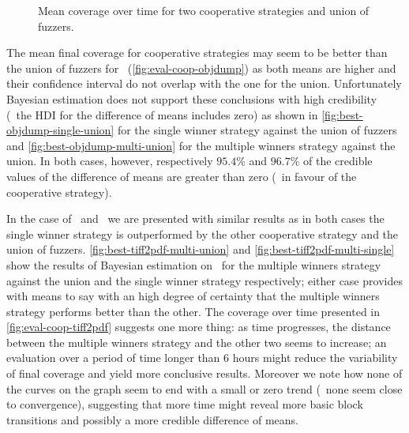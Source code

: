 \begin{figure}[h]
\begin{adjustbox}{center}
{            \label{fig:eval-coop-tiff2pdf}
        }
    \end{adjustbox}
    \caption{Mean coverage over time for two cooperative strategies and union of
    fuzzers.}
    \label{fig:eval-coop}
\end{figure}

The mean final coverage for cooperative strategies may seem to be better than
the union of fuzzers for \objdump\ (\autoref{fig:eval-coop-objdump}) as both
means are higher and their confidence interval do not overlap with the one for
the union. Unfortunately Bayesian estimation does not support these conclusions
with high credibility (\ie~the \ac{HDI} for the difference of means includes
zero) as shown in \autoref{fig:best-objdump-single-union} for the single winner
strategy against the union of fuzzers and \autoref{fig:best-objdump-multi-union}
for the multiple winners strategy against the union. In both cases, however,
respectively $95.4\%$ and $96.7\%$ of the credible values of the difference of
means are greater than zero (\ie~in favour of the cooperative strategy).

In the case of \tiffpdf\ and \listswf\ we are presented with similar results as
in both cases the single winner strategy is outperformed by the other
cooperative strategy and the union of fuzzers.
\autoref{fig:best-tiff2pdf-multi-union} and
\autoref{fig:best-tiff2pdf-multi-single} show the results of Bayesian estimation
on \tiffpdf\ for the multiple winners strategy against the union and the single
winner strategy respectively; either case provides with means to say with an
high degree of certainty that the multiple winners strategy performs better than
the other. The coverage over time presented in \autoref{fig:eval-coop-tiff2pdf}
suggests one more thing: as time progresses, the distance between the multiple
winners strategy and the other two seems to increase; an evaluation over a
period of time longer than $6$ hours might reduce the variability of final
coverage and yield more conclusive results. Moreover we note how none of the
curves on the graph seem to end with a small or zero trend (\ie~none seem close
to convergence), suggesting that more time might reveal more basic block
transitions and possibly a more credible difference of means.

